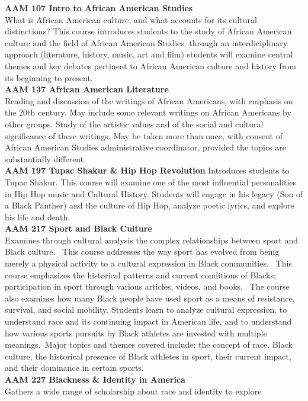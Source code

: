 \documentclass[
  letterpaper,
]{scrbook}
\begin{document}
\textbf{AAM 107 Intro to African American Studies}\\
What is African American culture, and what accounts for its cultural
distinctions? This course introduces students to the study of African
American culture and the field of African American Studies. through an
interdiciplinary approach (literature, history, music, art and film)
students will examine central themes and key debates pertinent to
African American culture and history from its beginning to present.\\
\textbf{AAM 137 African American Literature}\\
Reading and discussion of the writings of African Americans, with
emphasis on the 20th century. May include some relevant writings on
African Americans by other groups. Study of the artistic values and of
the social and cultural significance of these writings. May be taken
more than once, with consent of African American Studies administrative
coordinator, provided the topics are substantially different.\\
\textbf{AAM 197 Tupac Shakur \& Hip Hop Revolution} Introduces students
to Tupac Shakur. This course will examine one of the most influential
personalities in Hip Hop music and Cultural History. Students will
engage in his legacy (Son of a Black Panther) and the culture of Hip
Hop, analyze poetic lyrics, and explore his life and death.\\
\textbf{AAM 217 Sport and Black Culture}\\
Examines through cultural analysis the complex relationships between
sport and Black culture.~ This course addresses the way sport has
evolved from being merely a physical activity to a cultural expression
in Black communities.~ This course emphasizes the historical patterns
and current conditions of Blacks; participation in sport through various
articles, videos, and books.~ The course also examines how many Black
people have used sport as a means of resistance, survival, and social
mobility. Students learn to analyze cultural expression, to understand
race and its continuing impact in American life, and to understand how
various sports pursuits by Black athletes are invested with multiple
meanings.~Major topics and themes covered include: the concept of race,
Black culture, the historical presence of Black athletes in sport, their
current impact, and their dominance in certain sports.\\
\textbf{AAM 227 Blackness \& Identity in America}\\
Gathers a wide range of scholarship about race and identity to explore
\end{document}
